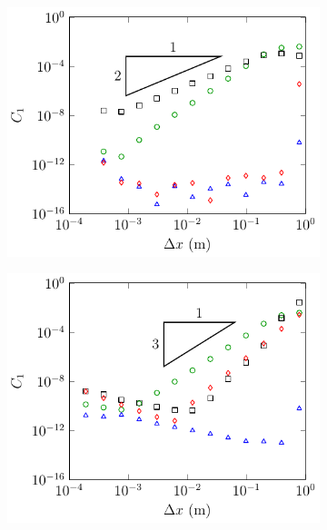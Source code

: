 \begin{figure}
	\begin{subfigure}{0.5\textwidth}
		\includegraphics[width=\textwidth]{./chp5/figures/Analytic/Soliton/C1/FEVM2.pdf}
		\vspace{0.3cm}
	\end{subfigure}%
	\begin{subfigure}{0.5\textwidth}
		\includegraphics[width=\textwidth]{./chp5/figures/Analytic/Soliton/C1/FDVM3.pdf}
		\vspace{0.3cm}
	\end{subfigure}
	\begin{subfigure}{0.5\textwidth}

\end{subfigure}
\end{figure}
